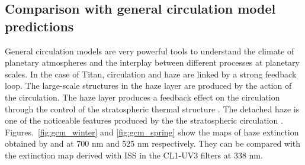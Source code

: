 \subsection{Comparison with general circulation model predictions}

General circulation models are very powerful tools to understand the climate of planetary atmospheres and the
interplay between different processes at planetary scales. In the case of Titan, circulation and haze are linked
by a strong feedback loop. The large-scale structures in the haze layer are produced by the action of the
circulation. The haze layer produces a feedback effect on the circulation through the control of the stratospheric
thermal structure \citep{Rannou2004}. The detached haze is one of the noticeable features produced by the the
stratospheric circulation \citep{Rannou2002, Lebonnois2012, Larson2015}. Figures.~\ref{fig:gcm_winter}
and \ref{fig:gcm_spring} show the maps of haze extinction obtained by \cite{Lebonnois2012} and
\cite{Larson2015} at 700 nm and 525 nm respectively. They can be compared with the extinction map derived
with ISS in the CL1-UV3 filters at 338 nm.

\begin{figure*}[!ht]
\caption{At the top, the zonally-averaged haze extinction at northern winter solstice
($L_s = \ang{270}$) estimated by \cite{Lebonnois2012} at the wavelength $\lambda = $ 700 nm (left)
and by \cite{Larson2015} at $\lambda = $ 525 nm (right). At the bottom, haze extinction map
retrieved from Cassini/ISS observation CL1-UV3 ($\lambda = $ 338 nm) in the middle of winter
(\textbf{N1477222048\_2} - $L_s = \ang{300}$).}
\label{fig:gcm_winter}
\end{figure*}

